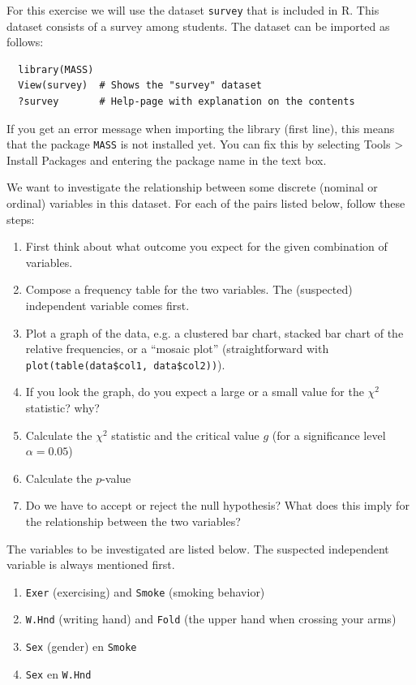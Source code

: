 \begin{exercise}
  \label{ex:chisq-survey}
  For this exercise we will use the dataset \texttt{survey} that is included in R. This dataset consists of a survey among students. The dataset can be imported as follows:
  
  \begin{lstlisting}
  library(MASS)
  View(survey)  # Shows the "survey" dataset
  ?survey       # Help-page with explanation on the contents
  \end{lstlisting}
  
  If you get an error message when importing the library (first line), this means that the package \texttt{MASS} is not installed yet. You can fix this by selecting Tools > Install Packages and entering the package name in the text box.
  
  We want to investigate the relationship between some discrete (nominal or ordinal) variables in this dataset. For each of the pairs listed below, follow these steps:
  
  \begin{enumerate}[label=(\alph*)]
    \item First think about what outcome you expect for the given combination of variables.
    \item Compose a frequency table for the two variables. The (suspected) independent variable comes first.
    \item Plot a graph of the data, e.g. a clustered bar chart, stacked bar chart of the relative frequencies, or a ``mosaic plot'' (straightforward with \texttt{plot(table(data\$col1, data\$col2))}).
    \item If you look the graph, do you expect a large or a small value for the $\chi^2$ statistic? why?
    \item Calculate the $\chi^2$ statistic and the critical value $g$ (for a significance level $\alpha = 0.05$)
    \item Calculate the $p$-value
    \item Do we have to accept or reject the null hypothesis? What does this imply for the relationship between the two variables?
  \end{enumerate}
  
  The variables to be investigated are listed below. The suspected independent variable is always mentioned first.
  
  \begin{enumerate}
    \item \texttt{Exer} (exercising) and \texttt{Smoke} (smoking behavior)
    \item \texttt{W.Hnd} (writing hand) and \texttt{Fold} (the upper hand when crossing your arms)
    \item \texttt{Sex} (gender) en \texttt{Smoke}
    \item \texttt{Sex} en \texttt{W.Hnd}
  \end{enumerate}
\end{exercise}

